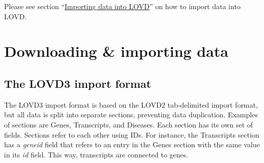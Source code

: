 \documentclass[a4paper,oneside,openany,12pt]{memoir}
\begin{document}
Please see section ``\hyperlink{sec:download_importing_data}{Importing data into LOVD}'' on how to import data into LOVD.
\clearpage %










\hypertarget{chap:download_n_import}{}
\chapter{Downloading \& importing data}
\hypertarget{sec:download_import_format}{}
\section{The LOVD3 import format}
The LOVD3 import format is based on the LOVD2 tab-delimited import format, but all data is split into separate sections, preventing data duplication.
Examples of sections are Genes, Transcripts, and Diseases.
Each section has its own set of fields.
Sections refer to each other using IDs.
For instance, the Transcripts section has a \emph{geneid} field that refers to an entry in the Genes section with the same value in its \emph{id} field.
This way, transcripts are connected to genes.
\end{document}
